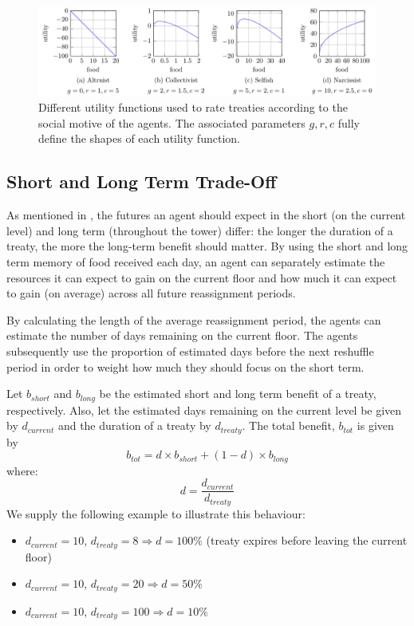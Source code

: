 \begin{figure}[htb]
    \centering
    \includegraphics[width=0.95\linewidth]{008_team_6_agent_design/utility_functions/utility_functions.pdf}
    \caption{Different utility functions used to rate treaties according to the social motive of the agents. The associated parameters $g,r,c$ fully define the shapes of each utility function.}
    \label{fig:utilities}
\end{figure}

\subsection{Short and Long Term Trade-Off}
As mentioned in , the futures an agent should expect in the short (on the current level) and long term (throughout the tower) differ: the longer the duration of a treaty, the more the long-term benefit should matter. By using the short and long term memory of food received each day, an agent can separately estimate the resources it can expect to gain on the current floor and how much it can expect to gain (on average) across all future reassignment periods.

By calculating the length of the average reassignment period, the agents can estimate the number of days remaining on the current floor. The agents subsequently use the proportion of estimated days before the next reshuffle period in order to weight how much they should focus on the short term. 

Let $b_\mathit{short}$ and $b_\mathit{long}$ be the estimated short and long term benefit of a treaty, respectively. Also, let the estimated days remaining on the current level be given by $d_\mathit{current}$ and the duration of a treaty by $d_\mathit{treaty}$. The total benefit, $b_\mathit{tot}$ is given by
\begin{equation}
b_\mathit{tot} = d\times b_\mathit{short} + (1-d)\times b_\mathit{long}
\label{eq:shortlongweight}
\end{equation}
where:
\begin{equation}
    d = \frac{d_\mathit{current}}{d_\mathit{treaty}}
\end{equation}
We supply the following example to illustrate this behaviour:
\begin{itemize}
    \item $d_\mathit{current} = 10$, $d_\mathit{treaty} = 8 \Rightarrow d=100\%$ (treaty expires before leaving the current floor)
    \item $d_\mathit{current} = 10$, $d_\mathit{treaty} = 20 \Rightarrow d=50\%$
    \item $d_\mathit{current} = 10$, $d_\mathit{treaty} = 100 \Rightarrow d = 10\%$
\end{itemize}

